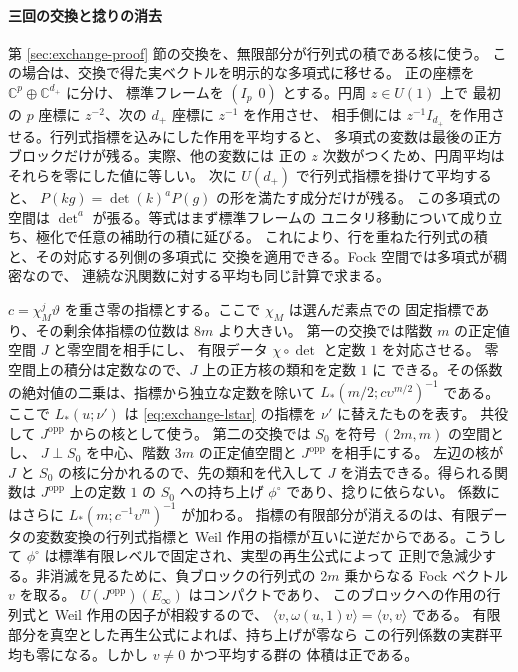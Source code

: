 \paragraph{三回の交換と捻りの消去}
第 \ref{sec:exchange-proof} 節の交換を、無限部分が行列式の積である核に使う。
この場合は、交換で得た実ベクトルを明示的な多項式に移せる。
正の座標を \(\mathbb C^{p}\oplus\mathbb C^{d_+}\) に分け、
標準フレームを \((I_p\ \ 0)\) とする。円周 \(z\in U(1)\) 上で
最初の \(p\) 座標に \(z^{-2}\)、次の \(d_+\) 座標に \(z^{-1}\) を作用させ、
相手側には \(z^{-1}I_{d_+}\) を作用させる。行列式指標を込みにした作用を平均すると、
多項式の変数は最後の正方ブロックだけが残る。実際、他の変数には
正の \(z\) 次数がつくため、円周平均はそれらを零にした値に等しい。
次に \(U(d_+)\) で行列式指標を掛けて平均すると、
\(P(kg)=\det(k)^aP(g)\) の形を満たす成分だけが残る。
この多項式の空間は \(\det^a\) が張る。等式はまず標準フレームの
ユニタリ移動について成り立ち、極化で任意の補助行の積に延びる。
これにより、行を重ねた行列式の積と、その対応する列側の多項式に
交換を適用できる。Fock 空間では多項式が稠密なので、
連続な汎関数に対する平均も同じ計算で求まる。

\(c=\chi_M^j\vartheta\) を重さ零の指標とする。ここで \(\chi_M\) は選んだ素点での
固定指標であり、その剰余体指標の位数は \(8m\) より大きい。
第一の交換では階数 \(m\) の正定値空間 \(J\) と零空間を相手にし、
有限データ \(\chi\circ\det\) と定数 \(1\) を対応させる。
零空間上の積分は定数なので、\(J\) 上の正方核の類和を定数 \(1\) に
できる。その係数の絶対値の二乗は、指標から独立な定数を除いて
\(L_*(m/2;c\upsilon^{m/2})^{-1}\) である。ここで \(L_*(u;\nu')\) は
\eqref{eq:exchange-lstar} の指標を \(\nu'\) に替えたものを表す。
共役して \(J^{\mathrm{opp}}\) からの核として使う。
第二の交換では \(S_0\) を符号 \((2m,m)\) の空間とし、
\(J\perp S_0\) を中心、階数 \(3m\) の正定値空間と \(J^{\mathrm{opp}}\) を相手にする。
左辺の核が \(J\) と \(S_0\) の核に分かれるので、先の類和を代入して
\(J\) を消去できる。得られる関数は \(J^{\mathrm{opp}}\) 上の定数 \(1\) の
\(S_0\) への持ち上げ \(\phi^\circ\) であり、捻りに依らない。
係数にはさらに \(L_*(m;c^{-1}\upsilon^m)^{-1}\) が加わる。
指標の有限部分が消えるのは、有限データの変数変換の行列式指標と
Weil 作用の指標が互いに逆だからである。こうして
\(\phi^\circ\) は標準有限レベルで固定され、実型の再生公式によって
正則で急減少する。非消滅を見るために、負ブロックの行列式の
\(2m\) 乗からなる Fock ベクトル \(v\) を取る。
\(U(J^{\mathrm{opp}})(E_\infty)\) はコンパクトであり、
このブロックへの作用の行列式と Weil 作用の因子が相殺するので、
\(\langle v,\omega(u,1)v\rangle=\langle v,v\rangle\) である。
有限部分を真空とした再生公式によれば、持ち上げが零なら
この行列係数の実群平均も零になる。しかし \(v\ne0\) かつ平均する群の
体積は正である。

